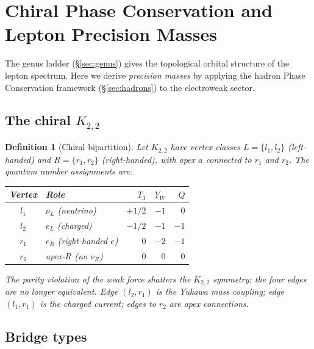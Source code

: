 \documentclass[11pt]{article}
\newtheorem{definition}[theorem]{Definition}
\begin{document}
\section{Chiral Phase Conservation and Lepton Precision Masses}
\label{sec:chiral}

The genus ladder (\S\ref{sec:genus}) gives the topological orbital
structure of the lepton spectrum.  Here we derive \emph{precision
masses} by applying the hadron Phase Conservation framework
(\S\ref{sec:hadrons}) to the electroweak sector.

\subsection{The chiral $K_{2,2}$}

\begin{definition}[Chiral bipartition]
\label{def:chiral}
Let $K_{2,2}$ have vertex classes
$L = \{l_1, l_2\}$ (left-handed) and
$R = \{r_1, r_2\}$ (right-handed), with apex $a$ connected
to $r_1$ and $r_2$.  The quantum number assignments are:
\begin{center}
\renewcommand{\arraystretch}{1.3}
\begin{tabular}{clrrr}
\toprule
Vertex & Role & $T_3$ & $Y_W$ & $Q$ \\
\midrule
$l_1$ & $\nu_L$ (neutrino) & $+1/2$ & $-1$ & $0$ \\
$l_2$ & $e_L$ (charged) & $-1/2$ & $-1$ & $-1$ \\
$r_1$ & $e_R$ (right-handed $e$) & $0$ & $-2$ & $-1$ \\
$r_2$ & apex-$R$ (no $\nu_R$) & $0$ & $0$ & $0$ \\
\bottomrule
\end{tabular}
\end{center}
The parity violation of the weak force shatters the
$K_{2,2}$ symmetry: the four edges are no longer equivalent.
Edge $(l_2, r_1)$ is the Yukawa mass coupling; edge $(l_1, r_1)$
is the charged current; edges to $r_2$ are apex connections.
\end{definition}

\subsection{Bridge types}
\end{document}
